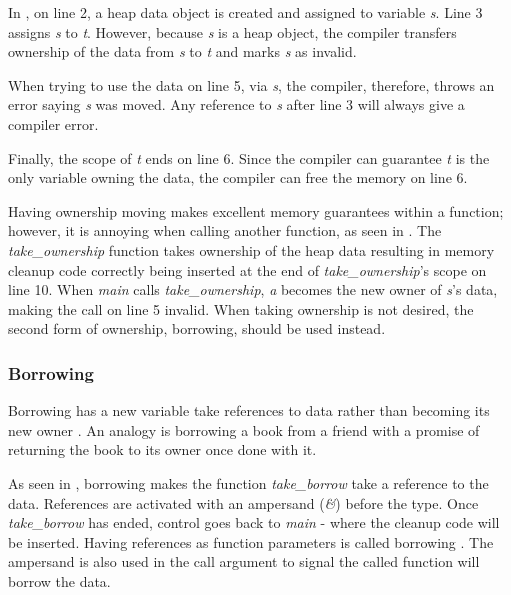 
In , on line 2, a heap data object is created and assigned to variable \textit{s}.
Line 3 assigns \textit{s} to \textit{t}.
However, because \textit{s} is a heap object, the compiler transfers ownership of the data from \textit{s} to \textit{t} and marks \textit{s} as invalid.

When trying to use the data on line 5, via \textit{s}, the compiler, therefore, throws an error saying \textit{s} was moved.
Any reference to \textit{s} after line 3 will always give a compiler error.

Finally, the scope of \textit{t} ends on line 6.
Since the compiler can guarantee \textit{t} is the only variable owning the data, the compiler can free the memory on line 6.


Having ownership moving makes excellent memory guarantees within a function; however, it is annoying when calling another function, as seen in .
The \textit{take\_ownership} function takes ownership of the heap data resulting in memory cleanup code correctly being inserted at the end of \textit{take\_ownership}'s scope on line 10.
When \textit{main} calls \textit{take\_ownership}, \textit{a} becomes the new owner of \textit{s}'s data, making the call on line 5 invalid.
When taking ownership is not desired, the second form of ownership, borrowing, should be used instead.

\subsubsection{Borrowing}

Borrowing has a new variable take references to data rather than becoming its new owner \cite{klabnik_2019_01}.
An analogy is borrowing a book from a friend with a promise of returning the book to its owner once done with it.


As seen in , borrowing makes the function \textit{take\_borrow} take a reference to the data.
References are activated with an ampersand (\textit{\&}) before the type.
Once \textit{take\_borrow} has ended, control goes back to \textit{main} - where the cleanup code will be inserted.
Having references as function parameters is called borrowing \cite{klabnik_2019_01}.
The ampersand is also used in the call argument to signal the called function will borrow the data.

